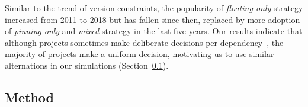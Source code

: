 Similar to the trend of version constraints, the popularity of \emph{floating only} strategy increased from 2011 to 2018 but has fallen since then, replaced by more adoption of \emph{pinning only} and \emph{mixed} strategy in the last five years.
Our results indicate that although projects sometimes make deliberate decisions per dependency~\cite{DBLP:journals/tosem/JafariCSA23}, the majority of projects make a uniform decision, motivating us to use similar alternations in our simulations (Section~\ref{sec:method-rq1}).

\subsection{Method}
\label{sec:method-rq1}

